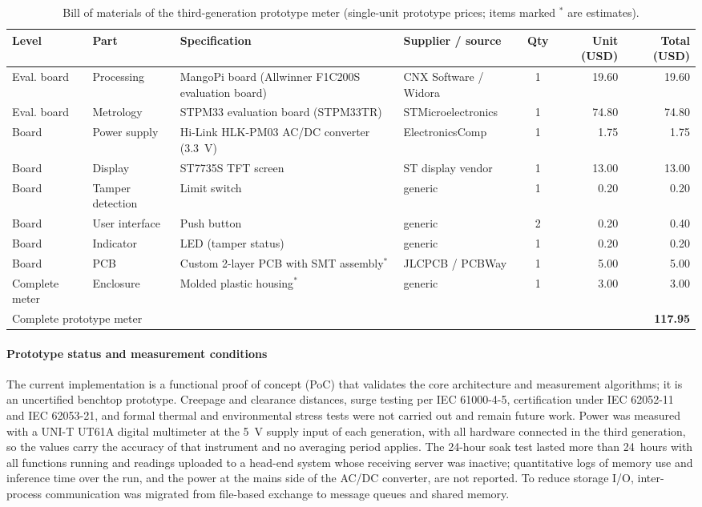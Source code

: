 \documentclass[fleqn,10pt]{wlscirep}
\begin{document}
\begin{table}[!t]
\centering
\caption{Bill of materials of the third-generation prototype meter (single-unit prototype prices; items marked $^{*}$ are estimates).}
\label{tab:bom}
\footnotesize
\begin{tabular}{@{}llp{4.0cm}p{3.6cm}crr@{}}
\toprule
Level & Part & Specification & Supplier / source & Qty & Unit (USD) & Total (USD) \\
\midrule
Eval. board & Processing & MangoPi board (Allwinner F1C200S evaluation board) & CNX Software / Widora & 1 & 19.60 & 19.60 \\
Eval. board & Metrology & STPM33 evaluation board (STPM33TR) & STMicroelectronics & 1 & 74.80 & 74.80 \\
Board & Power supply & Hi-Link HLK-PM03 AC/DC converter (3.3~V) & ElectronicsComp & 1 & 1.75 & 1.75 \\
Board & Display & ST7735S TFT screen & ST display vendor & 1 & 13.00 & 13.00 \\
Board & Tamper detection & Limit switch & generic & 1 & 0.20 & 0.20 \\
Board & User interface & Push button & generic & 2 & 0.20 & 0.40 \\
Board & Indicator & LED (tamper status) & generic & 1 & 0.20 & 0.20 \\
Board & PCB & Custom 2-layer PCB with SMT assembly$^{*}$ & JLCPCB / PCBWay & 1 & 5.00 & 5.00 \\
Complete meter & Enclosure & Molded plastic housing$^{*}$ & generic & 1 & 3.00 & 3.00 \\
\midrule
\multicolumn{6}{l}{Complete prototype meter} & \textbf{117.95} \\
\bottomrule
\end{tabular}
\end{table}

\paragraph{Prototype status and measurement conditions} The current implementation is a functional proof of concept (PoC) that validates the core architecture and measurement algorithms; it is an uncertified benchtop prototype. Creepage and clearance distances, surge testing per IEC 61000-4-5, certification under IEC 62052-11 and IEC 62053-21, and formal thermal and environmental stress tests were not carried out and remain future work. Power was measured with a UNI-T UT61A digital multimeter at the 5~V supply input of each generation, with all hardware connected in the third generation, so the values carry the accuracy of that instrument and no averaging period applies. The 24-hour soak test lasted more than 24~hours with all functions running and readings uploaded to a head-end system whose receiving server was inactive; quantitative logs of memory use and inference time over the run, and the power at the mains side of the AC/DC converter, are not reported. To reduce storage I/O, inter-process communication was migrated from file-based exchange to message queues and shared memory.
\end{document}
